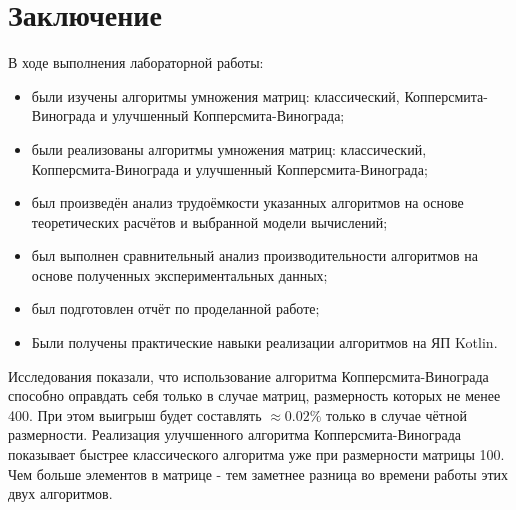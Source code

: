 \documentclass[12pt]{report}
\begin{document}
\chapter*{Заключение}
В ходе выполнения лабораторной работы:
\begin{itemize}
\item были изучены алгоритмы умножения матриц: классический, Копперсмита-Винограда и улучшенный Копперсмита-Винограда;
\item были реализованы алгоритмы умножения матриц: классический, Копперсмита-Винограда и улучшенный Копперсмита-Винограда;
\item был произведён анализ трудоёмкости указанных алгоритмов на основе теоретических расчётов и выбранной модели вычислений;
\item был выполнен сравнительный анализ производительности алгоритмов на основе полученных экспериментальных данных;
\item был подготовлен отчёт по проделанной работе;
\item Были получены практические навыки реализации алгоритмов на ЯП Kotlin.
\end{itemize}

Исследования показали, что использование алгоритма Копперсмита-Винограда способно оправдать себя только в случае матриц, размерность которых не менее 400. При этом выигрыш будет составлять $\approx0.02\%$ только в случае чётной размерности. Реализация улучшенного алгоритма Копперсмита-Винограда показывает быстрее классического алгоритма уже при размерности матрицы 100. Чем больше элементов в матрице - тем заметнее разница во времени работы этих двух алгоритмов.

\end{document}
